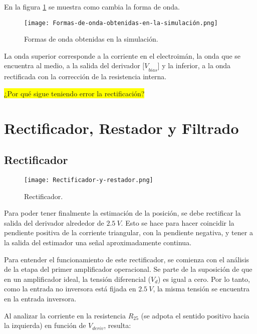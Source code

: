 \noindent En la figura \ref{fig:img_Formas_de_onda_obtenidas_en_la_simulación} se muestra como cambia la forma de onda.

\begin{figure}[H]
	\centering
	\texttt{[image: Formas-de-onda-obtenidas-en-la-simulación.png]}
	\caption{Formas de onda obtenidas en la simulación.}
	\label{fig:img_Formas_de_onda_obtenidas_en_la_simulación}
\end{figure}

\noindent La onda superior corresponde a la corriente en el electroim\'{a}n, la onda que se encuentra al medio, a la salida del derivador ${[V}_{bias}$$]$ y la inferior, a la onda rectificada con la correcci\'{o}n de la resistencia interna.

\colorbox{yellow}{¿Por qué sigue teniendo error la rectificación?}\\

\section{Rectificador, Restador y Filtrado}

\subsection{Rectificador}

\begin{figure}[H]
	\centering
	\texttt{[image: Rectificador-y-restador.png]}
	\caption{Rectificador.}
	\label{fig:img_Rectificador_y_restador}
\end{figure}

\noindent Para poder tener finalmente la estimaci\'{o}n de la posici\'{o}n, se debe rectificar la salida del derivador alrededor de $2.5\:V$. Esto se hace para hacer coincidir la pendiente positiva de la corriente triangular, con la pendiente negativa, y tener a la salida del estimador una se\~{n}al aproximadamente continua.

\noindent Para entender el funcionamiento de este rectificador, se comienza con el análisis de la etapa del primer amplificador operacional. Se parte de la suposici\'{o}n de que en un amplificador ideal, la tensi\'{o}n diferencial ($V_d$) es igual a cero. Por lo tanto, como la entrada no inversora est\'{a} fijada en $2.5\:V$, la misma tensi\'{o}n se encuentra en la entrada inversora.

\noindent Al analizar la corriente en la resistencia $R_{25}$ (se adpota el sentido positivo hacia la izquierda) en funci\'{o}n de $V_{deriv}$, resulta:

